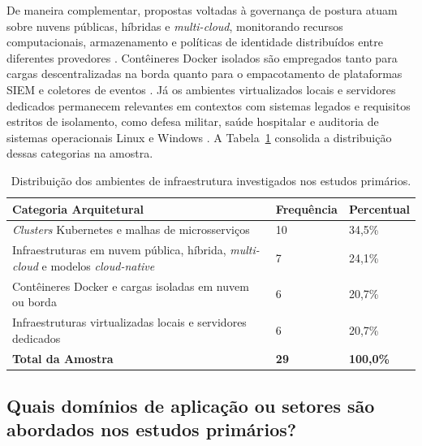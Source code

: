 De maneira complementar, propostas voltadas à governança de postura atuam sobre nuvens públicas, híbridas e \textit{multi-cloud}, monitorando recursos computacionais, armazenamento e políticas de identidade distribuídos entre diferentes provedores \cite{torkura2021,joshisabhaya2026,kumar2026}. Contêineres Docker isolados são empregados tanto para cargas descentralizadas na borda quanto para o empacotamento de plataformas SIEM e coletores de eventos \cite{sushma2025,bungei2026,zhang2025,velasquez2025}. Já os ambientes virtualizados locais e servidores dedicados permanecem relevantes em contextos com sistemas legados e requisitos estritos de isolamento, como defesa militar, saúde hospitalar e auditoria de sistemas operacionais Linux e Windows \cite{acosta2025,coutinho2023,setiawan2025,gajra2025}. A Tabela~\ref{tab:rsl_qs01} consolida a distribuição dessas categorias na amostra.

\begin{table}[!htbp]
    \centering
    \caption{Distribuição dos ambientes de infraestrutura investigados nos estudos primários.}
    \label{tab:rsl_qs01}
    \footnotesize
    \begin{tabular}{p{9.8cm}p{2.2cm}p{2.0cm}}
        \hline
        \textbf{Categoria Arquitetural} & \textbf{Frequência} & \textbf{Percentual} \\ \hline
        \textit{Clusters} Kubernetes e malhas de microsserviços & 10 & 34,5\% \\ \hline
        Infraestruturas em nuvem pública, híbrida, \textit{multi-cloud} e modelos \textit{cloud-native} & 7 & 24,1\% \\ \hline
        Contêineres Docker e cargas isoladas em nuvem ou borda & 6 & 20,7\% \\ \hline
        Infraestruturas virtualizadas locais e servidores dedicados & 6 & 20,7\% \\ \hline
        \textbf{Total da Amostra} & \textbf{29} & \textbf{100,0\%} \\ \hline
    \end{tabular}
\end{table}
\FloatBarrier

\subsection{Quais domínios de aplicação ou setores são abordados nos estudos primários?}
\label{subsec:rsl_qs02}

